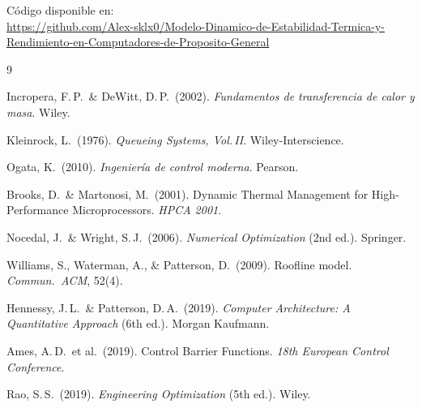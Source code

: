 \documentclass[10pt, twocolumn]{article}
\begin{document}
Código disponible en:\\ \url{https://github.com/Alex-sklx0/Modelo-Dinamico-de-Estabilidad-Termica-y-Rendimiento-en-Computadores-de-Proposito-General}

\begin{thebibliography}{9}

Incropera, F.\,P.\ \& DeWitt, D.\,P.\ (2002).
\emph{Fundamentos de transferencia de calor y masa}. Wiley.

Kleinrock, L.\ (1976).
\emph{Queueing Systems, Vol.\,II}. Wiley-Interscience.

Ogata, K.\ (2010).
\emph{Ingeniería de control moderna}. Pearson.

Brooks, D.\ \& Martonosi, M.\ (2001).
Dynamic Thermal Management for High-Performance Microprocessors.
\emph{HPCA 2001}.

Nocedal, J.\ \& Wright, S.\,J.\ (2006).
\emph{Numerical Optimization} (2nd ed.). Springer.

Williams, S., Waterman, A., \& Patterson, D.\ (2009).
Roofline model. \emph{Commun.\ ACM}, 52(4).

Hennessy, J.\,L.\ \& Patterson, D.\,A.\ (2019).
\emph{Computer Architecture: A Quantitative Approach} (6th ed.).
Morgan Kaufmann.

Ames, A.\,D.\ et al.\ (2019).
Control Barrier Functions.
\emph{18th European Control Conference}.

Rao, S.\,S.\ (2019).
\emph{Engineering Optimization} (5th ed.). Wiley.

\end{thebibliography}
\end{document}
